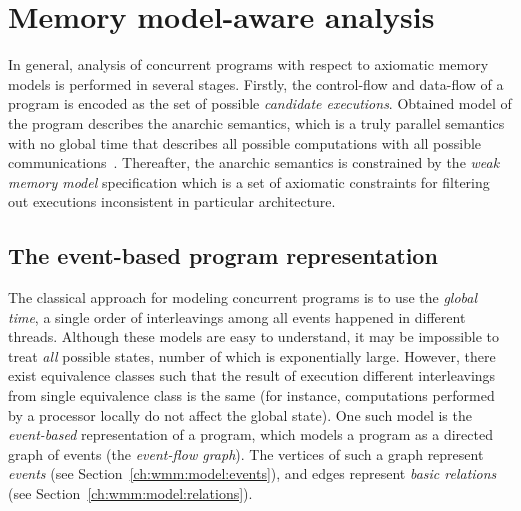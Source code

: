 
\chapter{Memory model-aware analysis}%
\label{ch:wmm}

In general, analysis of concurrent programs with respect to axiomatic memory models is performed in several stages. %
Firstly, the control-flow and data-flow of a program is encoded as the set of possible \textit{candidate executions}. %
Obtained model of the program describes the anarchic semantics, which is a truly parallel semantics with no global time that describes all possible computations with all possible communications~\cite{alglave2016syntax}. Thereafter, the anarchic semantics is constrained by the \textit{weak memory model} specification which is a set of axiomatic constraints for filtering out executions inconsistent in particular architecture.


\section{The event-based program representation}
\label{ch:wmm:event}

The classical approach for modeling concurrent programs is to use the \textit{global time}, a single order of interleavings among all events happened in different threads.
Although these models are easy to understand, it may be impossible to treat \textit{all} possible states, number of which is exponentially large.
However, there exist equivalence classes such that the result of execution different interleavings from single equivalence class is the same (for instance, computations performed by a processor locally do not affect the global state).
One such model is the \textit{event-based} representation of a program, which models a program as a directed graph of events (the \textit{event-flow graph}).
The vertices of such a graph represent \textit{events} (see Section~\ref{ch:wmm:model:events}), and edges represent \textit{basic relations} (see Section~\ref{ch:wmm:model:relations}).

